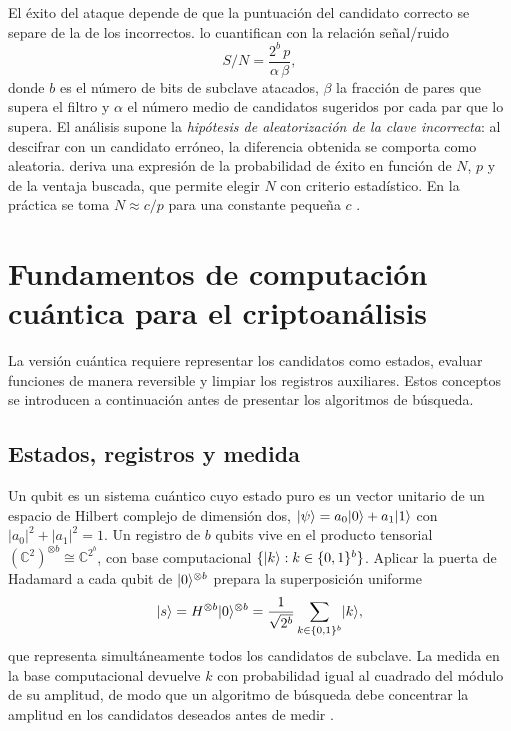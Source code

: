 El éxito del ataque depende de que la puntuación del candidato correcto se separe de la de los incorrectos. \citet{biham1991} lo cuantifican con la relación señal/ruido
\begin{equation}
 S/N=\frac{2^{b}\,p}{\alpha\,\beta},
 \label{eq:sn}
\end{equation}
donde \(b\) es el número de bits de subclave atacados, \(\beta\) la fracción de pares que supera el filtro y \(\alpha\) el número medio de candidatos sugeridos por cada par que lo supera. El análisis supone la \emph{hipótesis de aleatorización de la clave incorrecta}: al descifrar con un candidato erróneo, la diferencia obtenida se comporta como aleatoria. \citet{selcuk2008} deriva una expresión de la probabilidad de éxito en función de \(N\), \(p\) y de la ventaja buscada, que permite elegir \(N\) con criterio estadístico. En la práctica se toma \(N\approx c/p\) para una constante pequeña \(c\) \citep{heys2002}.

\section{Fundamentos de computación cuántica para el criptoanálisis}
\label{sec:fundamentos}

La versión cuántica requiere representar los candidatos como estados, evaluar funciones de manera reversible y limpiar los registros auxiliares. Estos conceptos se introducen a continuación antes de presentar los algoritmos de búsqueda.

\subsection{Estados, registros y medida}

Un qubit es un sistema cuántico cuyo estado puro es un vector unitario de un espacio de Hilbert complejo de dimensión dos, \(\lvert \psi\rangle=a_0\lvert 0\rangle+a_1\lvert 1\rangle\) con \(|a_0|^2+|a_1|^2=1\). Un registro de \(b\) qubits vive en el producto tensorial \((\mathbb{C}^2)^{\otimes b}\cong\mathbb{C}^{2^b}\), con base computacional \(\{\lvert k\rangle:k\in\{0,1\}^b\}\). Aplicar la puerta de Hadamard a cada qubit de \(\lvert 0\rangle^{\otimes b}\) prepara la superposición uniforme
\begin{equation}
 \lvert s\rangle=H^{\otimes b}\lvert 0\rangle^{\otimes b}=\frac{1}{\sqrt{2^b}}\sum_{k\in\{0,1\}^b}\lvert k\rangle,
 \label{eq:uniforme}
\end{equation}
que representa simultáneamente todos los candidatos de subclave. La medida en la base computacional devuelve \(k\) con probabilidad igual al cuadrado del módulo de su amplitud, de modo que un algoritmo de búsqueda debe concentrar la amplitud en los candidatos deseados antes de medir \citep{nielsen2010}.

